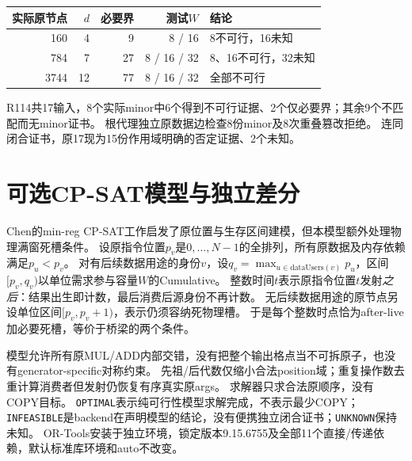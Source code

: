 \documentclass[UTF8,11pt,a4paper]{ctexart}
\begin{document}
\begin{center}
\begin{tabular}{rrrrl}
\toprule
实际原节点 & $d$ & 必要界 & 测试$W$ & 结论\\
\midrule
160 & 4 & 9 & 8 / 16 & 8不可行，16未知\\
784 & 7 & 27 & 8 / 16 / 32 & 8、16不可行，32未知\\
3744 & 12 & 77 & 8 / 16 / 32 & 全部不可行\\
\bottomrule
\end{tabular}
\end{center}
R114共17输入，8个实际minor中6个得到不可行证据、2个仅必要界；其余9个不匹配而无minor证书。
根代理独立原数据边检查8份minor及8次重叠篡改拒绝。
连同闭合证书，原17现为15份作用域明确的否定证据、2个未知。

\section{可选CP-SAT模型与独立差分}
Chen的min-reg CP-SAT工作\cite{chen}启发了原位置与生存区间建模，但本模型额外处理物理满窗死槽条件。
设原指令位置$p_v$是$0,\ldots,N-1$的全排列，所有原数据及内存依赖满足$p_u<p_v$。
对有后续数据用途的身份$v$，设$q_v=\max_{u\in\mathrm{dataUsers}(v)}p_u$，区间$[p_v,q_v)$以单位需求参与容量$W$的Cumulative。
整数时间$t$表示原指令位置$t$发射\emph{之后}：结果出生即计数，最后消费后源身份不再计数。
无后续数据用途的原节点另设单位区间$[p_v,p_v+1)$，表示仍须容纳死物理槽。
于是每个整数时点恰为after-live加必要死槽，等价于桥梁的两个条件。

模型允许所有原MUL/ADD内部交错，没有把整个输出格点当不可拆原子，也没有generator-specific对称约束。
先祖/后代数仅缩小合法position域；重复操作数去重计算消费者但发射仍恢复有序真实原args。
求解器只求合法原顺序，没有COPY目标。
\texttt{OPTIMAL}表示纯可行性模型求解完成，不表示最少COPY；\texttt{INFEASIBLE}是backend在声明模型的结论，没有便携独立闭合证书；\texttt{UNKNOWN}保持未知。
OR-Tools安装于独立环境，锁定版本9.15.6755及全部11个直接/传递依赖，默认标准库环境和auto不改变\cite{ortools}。
\end{document}
